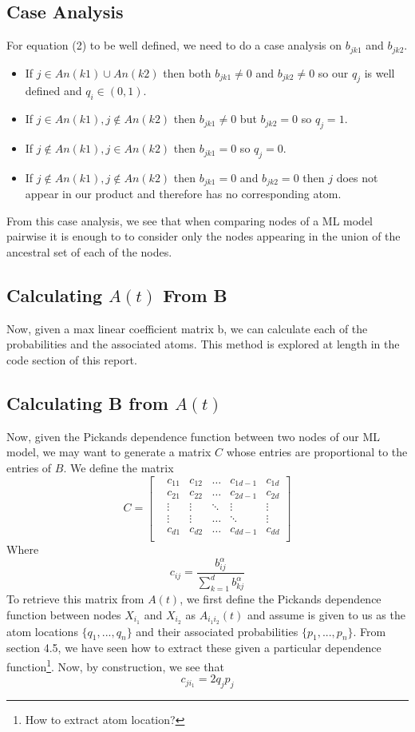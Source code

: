 \documentclass[12pt]{article}
\theoremstyle{definition}
\theoremstyle{definition}
\begin{document}
\subsection{Case Analysis}
For equation (2) to be well defined, we need to do a case analysis on $b_{jk1}$ and $b_{jk2}$. 
\begin{itemize}
    \item If $j\in An(k1)\cup An(k2)$ then both $b_{jk1}\neq 0$ and $b_{jk2}\neq 0$ so our $q_j$ is well defined and $q_i\in (0,1)$.
    \item If $j\in An(k1),j\notin An(k2)$ then $b_{jk1}\neq 0$ but $b_{jk2}= 0$ so $q_j=1$.
    \item If $j\notin An(k1),j\in An(k2)$ then $b_{jk1}= 0$ so $q_j=0$.
    \item If $j\notin An(k1),j\notin An(k2)$ then $b_{jk1}= 0$ and $b_{jk2}= 0$ then $j$ does not appear in our product and therefore has no corresponding atom.
\end{itemize}
From this case analysis, we see that when comparing nodes of a ML model pairwise it is enough to to consider only the nodes appearing in the union of the ancestral set of each of the nodes.

\subsection{Calculating $A(t)$ From B}
Now, given a max linear coefficient matrix b, we can calculate each of the probabilities and the associated atoms. This method is explored at length in the code section of this report.

\subsection{Calculating B from $A(t)$}
Now, given the Pickands dependence function between two nodes of our ML model, we may want to generate a matrix $C$ whose entries are proportional to the entries of $B$. We define the matrix
\[ C=\begin{bmatrix}
&c_{11} &c_{12}&\hdots& c_{1d-1}& c_{1d}\\
&c_{21} &c_{22}&\hdots& c_{2d-1}& c_{2d}\\
&\vdots&\vdots&\ddots & \vdots& \vdots \\
&\vdots&\vdots&\hdots & \ddots& \vdots \\
&c_{d1}& c_{d2} & \hdots &c_{dd-1}& c_{dd}\\
\end{bmatrix}
\]
Where  $$c_{ij}=\frac{b^\alpha_{ij}}{\sum_{k=1}^db_{kj}^\alpha}$$
To retrieve this matrix from $A(t)$, we first define the Pickands dependence function between nodes $X_{i_1}$ and $X_{i_2}$ as $A_{i_1i_2}(t)$ and assume is given to us as the atom locations $\{q_1,...,q_n\}$ and their associated probabilities $\{p_1,...,p_n\}$. From section 4.5, we have seen how to extract these given a particular dependence function\footnote{How to extract atom location?}. Now, by construction, we see that 
$$c_{ji_1}=2q_jp_j$$







 
\end{document}
